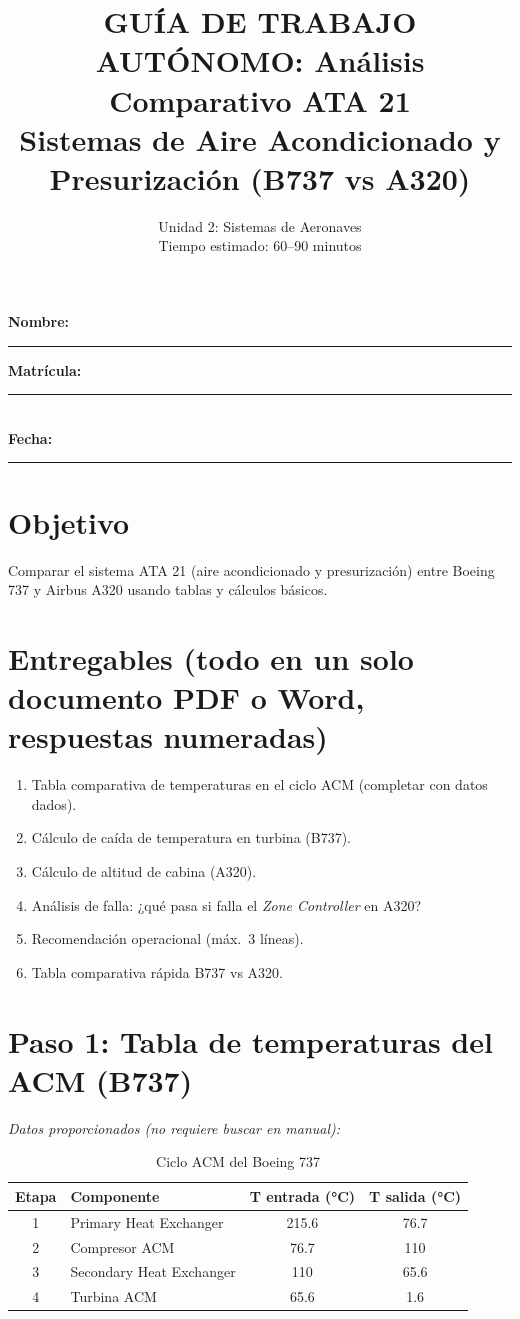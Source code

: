 \documentclass[11pt, a4paper]{article}
\title{\vspace{-2cm}\textbf{GUÍA DE TRABAJO AUTÓNOMO: Análisis Comparativo ATA 21}\\ \large Sistemas de Aire Acondicionado y Presurización (B737 vs A320)}
\author{Unidad 2: Sistemas de Aeronaves \\ \small Tiempo estimado: 60--90 minutos}
\date{}
\begin{document}
\maketitle
\vspace{-1cm}

\noindent\textbf{Nombre:} \rule{6cm}{0.4pt} \hfill \textbf{Matrícula:} \rule{5cm}{0.4pt} \\
\vspace{0.2cm}
\noindent\textbf{Fecha:} \rule{4cm}{0.4pt}

\section*{Objetivo}
Comparar el sistema ATA 21 (aire acondicionado y presurización) entre Boeing 737 y Airbus A320 usando tablas y cálculos básicos.

\section*{Entregables (todo en un solo documento PDF o Word, respuestas numeradas)}
\begin{enumerate}
    \item Tabla comparativa de temperaturas en el ciclo ACM (completar con datos dados).
    \item Cálculo de caída de temperatura en turbina (B737).
    \item Cálculo de altitud de cabina (A320).
    \item Análisis de falla: ¿qué pasa si falla el \textit{Zone Controller} en A320?
    \item Recomendación operacional (máx.\ 3 líneas).
    \item Tabla comparativa rápida B737 vs A320.
\end{enumerate}

\section{Paso 1: Tabla de temperaturas del ACM (B737)}
\textit{Datos proporcionados (no requiere buscar en manual):}

\begin{table}[h]
\centering
\caption{Ciclo ACM del Boeing 737}
\begin{tabular}{|c|l|c|c|}
\hline
\textbf{Etapa} & \textbf{Componente} & \textbf{T entrada (°C)} & \textbf{T salida (°C)} \\ \hline
1 & Primary Heat Exchanger & 215.6 & 76.7 \\ \hline
2 & Compresor ACM & 76.7 & 110 \\ \hline
3 & Secondary Heat Exchanger & 110 & 65.6 \\ \hline
4 & Turbina ACM & 65.6 & 1.6 \\ \hline
\end{tabular}
\end{table}
\end{document}

